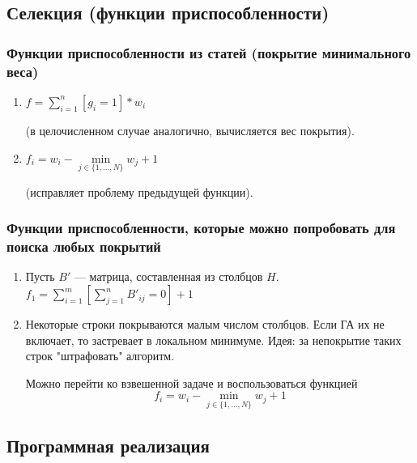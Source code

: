 \documentclass[
	11pt,
]{beamer}
\begin{document}
\subsection{Селекция (функции приспособленности)}

\begin{frame}
	\frametitle{Функции приспособленности из статей (покрытие минимального веса)}
	\begin{enumerate}
		\item $f = \sum\limits_{i=1}^n[g_i = 1] * w_i$
		
		(в целочисленном случае аналогично, вычисляется вес покрытия).

		\item $f_i = w_i - \min\limits_{j \in \{1, ..., N\}} w_j + 1$
		
		(исправляет проблему предыдущей функции).
	\end{enumerate}
\end{frame}

\begin{frame}
	\frametitle{Функции приспособленности, которые можно попробовать для поиска любых покрытий}
	\begin{enumerate}
		\item Пусть $B'$ — матрица, составленная из столбцов $H$.
			  $f_1 = \sum\limits_{i=1}^m[\sum\limits_{j=1}^n B'_{ij} = 0] + 1$
		\item Некоторые строки покрываются малым числом столбцов. Если ГА их не включает, то застревает в локальном минимуме. Идея: за непокрытие таких строк "штрафовать" алгоритм.

			  Можно перейти ко взвешенной задаче и воспользоваться функцией
			  $$f_i = w_i - \min\limits_{j \in \{1, ..., N\}} w_j + 1$$
	\end{enumerate}
\end{frame}

\subsection{Программная реализация}
\end{document}

